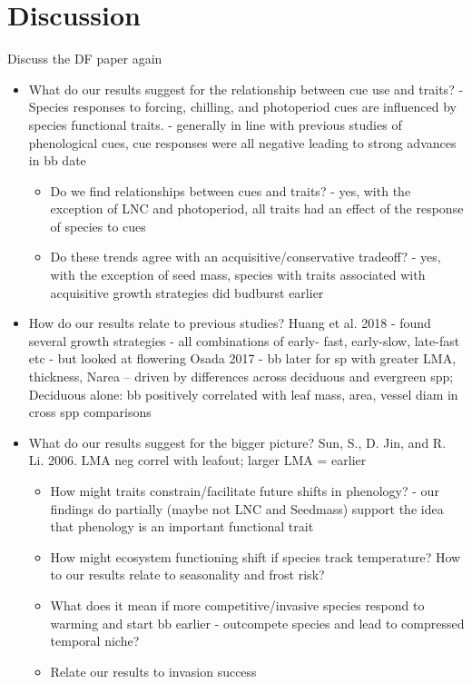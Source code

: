 \documentclass{article}\usepackage[]{graphicx}\usepackage[]{color}
\begin{document}
\section{Discussion}

Discuss the DF paper again 

\begin{itemize}
\item What do our results suggest for the relationship between cue use and traits? 
- Species responses to forcing, chilling, and photoperiod cues are influenced by species functional traits. 
- generally in line with previous studies of phenological cues, cue responses were all negative leading to strong advances in bb date 
	\begin{itemize}
	\item Do we find relationships between cues and traits?
	- yes, with the exception of LNC and photoperiod, all traits had an effect of the response of species to cues
	\item Do these trends agree with an acquisitive/conservative tradeoff?
	- yes, with the exception of seed mass, species with traits associated with acquisitive growth strategies did budburst earlier
	\end{itemize}
\item How do our results relate to previous studies? 
        Huang et al. 2018 - found several growth strategies - all combinations of early- fast, early-slow, late-fast etc - but looked at flowering
        Osada 2017 - bb later for sp with greater LMA, thickness, Narea – driven by differences across deciduous and evergreen spp; 	Deciduous alone: bb positively correlated with leaf mass, area, vessel diam in cross spp comparisons
\item What do our results suggest for the bigger picture?
Sun, S., D. Jin, and R. Li. 2006. LMA neg correl with leafout; larger LMA = earlier
	\begin{itemize}
	\item How might traits constrain/facilitate future shifts in phenology?
	- our findings do partially (maybe not LNC and Seedmass) support the idea that phenology is an important functional trait
	\item How might ecosystem functioning shift if species track temperature? How to our results relate to seasonality and frost risk?
	\item What does it mean if more competitive/invasive species respond to warming and start bb earlier - outcompete species and lead to compressed temporal niche?
	\item Relate our results to invasion success 
	\end{itemize}


\end{itemize}
\end{document}
